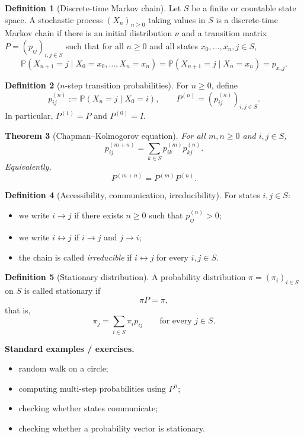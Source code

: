 \documentclass[11pt]{article}
\newtheorem{theorem}{Theorem}[section]
\theoremstyle{definition}
\newtheorem{definition}[theorem]{Definition}
\begin{document}
\begin{definition}[Discrete-time Markov chain]
Let $S$ be a finite or countable state space. A stochastic process $(X_n)_{n\ge 0}$ taking values in $S$ is a discrete-time Markov chain if there is an initial distribution $\nu$ and a transition matrix $P=(p_{ij})_{i,j\in S}$ such that for all $n\ge 0$ and all states $x_0,\dots,x_n,j\in S$,
\[
\mathbb P(X_{n+1}=j\mid X_0=x_0,\dots,X_n=x_n)
=
\mathbb P(X_{n+1}=j\mid X_n=x_n)
=
p_{x_nj}.
\]
\end{definition}

\begin{definition}[$n$-step transition probabilities]
For $n\ge 0$, define
\[
p_{ij}^{(n)}:=\mathbb P(X_n=j\mid X_0=i),
\qquad P^{(n)}=(p_{ij}^{(n)})_{i,j\in S}.
\]
In particular, $P^{(1)}=P$ and $P^{(0)}=I$.
\end{definition}

\begin{theorem}[Chapman--Kolmogorov equation]
For all $m,n\ge 0$ and $i,j\in S$,
\[
p_{ij}^{(m+n)}=\sum_{k\in S} p_{ik}^{(m)}p_{kj}^{(n)}.
\]
Equivalently,
\[
P^{(m+n)}=P^{(m)}P^{(n)}.
\]
\end{theorem}

\begin{definition}[Accessibility, communication, irreducibility]
For states $i,j\in S$:
\begin{itemize}[leftmargin=2em]
    \item we write $i\to j$ if there exists $n\ge 0$ such that $p_{ij}^{(n)}>0$;
    \item we write $i\leftrightarrow j$ if $i\to j$ and $j\to i$;
    \item the chain is called \emph{irreducible} if $i\leftrightarrow j$ for every $i,j\in S$.
\end{itemize}
\end{definition}

\begin{definition}[Stationary distribution]
A probability distribution $\pi=(\pi_i)_{i\in S}$ on $S$ is called stationary if
\[
\pi P=\pi,
\]
that is,
\[
\pi_j=\sum_{i\in S}\pi_i p_{ij}
\qquad \text{for every } j\in S.
\]
\end{definition}

\textbf{Standard examples / exercises.}
\begin{itemize}[leftmargin=2em]
    \item random walk on a circle;
    \item computing multi-step probabilities using $P^n$;
    \item checking whether states communicate;
    \item checking whether a probability vector is stationary.
\end{itemize}
\end{document}
